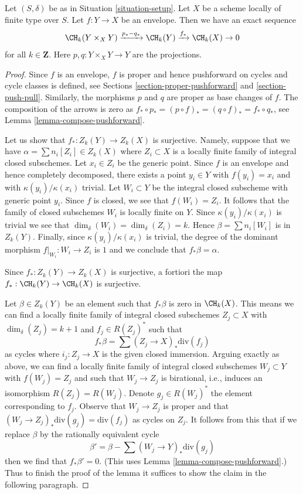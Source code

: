\begin{lemma}
\label{lemma-envelope}
Let $(S, \delta)$ be as in Situation \ref{situation-setup}.
Let $X$ be a scheme locally of finite type over $S$.
Let $f : Y \to X$ be an envelope. Then
we have an exact sequence
$$
\CH_k(Y \times_X Y) \xrightarrow{p_* - q_*}
\CH_k(Y) \xrightarrow{f_*}
\CH_k(X) \to 0
$$
for all $k \in \mathbf{Z}$. Here $p, q : Y \times_X Y \to Y$ are
the projections.
\end{lemma}

\begin{proof}
Since $f$ is an envelope, $f$ is proper and hence pushforward on
cycles and cycle classes is defined, see
Sections \ref{section-proper-pushforward} and \ref{section-push-pull}.
Similarly, the morphisms $p$ and $q$ are proper as base changes of $f$.
The composition of the arrows is zero as
$f_* \circ p_* = (p \circ f)_* = (q \circ f)_* = f_* \circ q_*$, see
Lemma \ref{lemma-compose-pushforward}.

\medskip\noindent
Let us show that $f_* : Z_k(Y) \to Z_k(X)$ is surjective.
Namely, suppose that we have $\alpha = \sum n_i[Z_i] \in Z_k(X)$
where $Z_i \subset X$ is a locally finite family of integral
closed subschemes. Let $x_i \in Z_i$ be the generic point.
Since $f$ is an envelope and hence completely decomposed,
there exists a point $y_i \in Y$ with $f(y_i) = x_i$
and with $\kappa(y_i)/\kappa(x_i)$ trivial. Let $W_i \subset Y$
be the integral closed subscheme with generic point $y_i$.
Since $f$ is closed, we see that $f(W_i) = Z_i$.
It follows that the family of closed subschemes $W_i$ is locally finite
on $Y$. Since $\kappa(y_i)/\kappa(x_i)$ is trivial we see
that $\dim_\delta(W_i) = \dim_\delta(Z_i) = k$. Hence
$\beta = \sum n_i[W_i]$ is in $Z_k(Y)$. Finally, since
$\kappa(y_i)/\kappa(x_i)$ is trivial, the degree of the dominant
morphism $f|_{W_i} : W_i \to Z_i$ is $1$ and we conclude
that $f_*\beta = \alpha$.

\medskip\noindent
Since $f_* : Z_k(Y) \to Z_k(X)$ is surjective, a fortiori the map
$f_* : \CH_k(Y) \to \CH_k(X)$ is surjective.

\medskip\noindent
Let $\beta \in Z_k(Y)$ be an element such that $f_*\beta$ is zero in
$\CH_k(X)$. This means we can find a locally finite family of
integral closed subschemes $Z_j \subset X$ with $\dim_\delta(Z_j) = k + 1$
and $f_j \in R(Z_j)^*$ such that
$$
f_*\beta = \sum (Z_j \to X)_*\text{div}(f_j)
$$
as cycles where $i_j : Z_j \to X$ is the given closed immersion.
Arguing exactly as above, we can find a locally finite
family of integral closed subschemes $W_j \subset Y$
with $f(W_j) = Z_j$ and such that $W_j \to Z_j$ is birational, i.e.,
induces an isomorphism $R(Z_j) = R(W_j)$. Denote $g_j \in R(W_j)^*$
the element corresponding to $f_j$. Observe that $W_j \to Z_j$
is proper and that $(W_j \to Z_j)_*\text{div}(g_j) = \text{div}(f_j)$
as cycles on $Z_j$. It follows from this that if we replace
$\beta$ by the rationally equivalent cycle
$$
\beta' = \beta - \sum (W_j \to Y)_*\text{div}(g_j)
$$
then we find that $f_*\beta' = 0$.
(This uses Lemma \ref{lemma-compose-pushforward}.)
Thus to finish the proof
of the lemma it suffices to show the claim in the following paragraph.


\end{proof}
